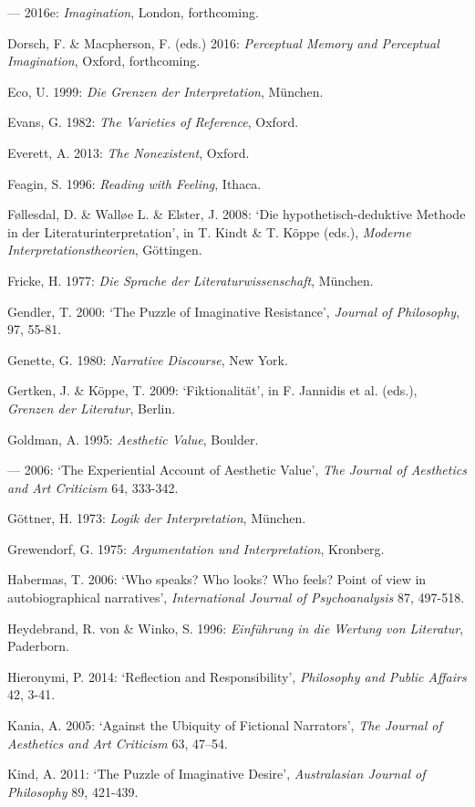 \begin{hangparas}{.5cm}{1}
--- 2016e: \emph{Imagination}, London, forthcoming.

Dorsch, F. \& Macpherson, F. (eds.) 2016: \emph{Perceptual Memory and Perceptual Imagination}, Oxford, forthcoming. 

Eco, U. 1999: \emph{Die Grenzen der Interpretation}, M\"unchen. 

Evans, G. 1982: \emph{The Varieties of Reference}, Oxford. 

Everett, A. 2013: \emph{The Nonexistent}, Oxford. 

Feagin, S. 1996: \emph{Reading with Feeling}, Ithaca.

F\o{}llesdal, D. \& Wall\o{}e L. \& Elster, J. 2008: `Die hypothetisch-deduktive Methode in der Literaturinterpretation', in T. Kindt \& T. K\"oppe (eds.), \emph{Moderne Interpretationstheorien}, G\"ottingen.

Fricke, H. 1977: \emph{Die Sprache der Literaturwissenschaft}, M\"unchen.

Gendler, T. 2000: `The Puzzle of Imaginative Resistance', \emph{Journal of Philosophy}, 97, 55-81.

Genette, G. 1980: \emph{Narrative Discourse}, New York. 

Gertken, J. \& K\"oppe, T. 2009: `Fiktionalit\"at', in F. Jannidis et al. (eds.), \emph{Grenzen der Literatur}, Berlin. 

Goldman, A. 1995: \emph{Aesthetic Value}, Boulder. 

--- 2006: `The Experiential Account of Aesthetic Value', \emph{The Journal of Aesthetics and Art Criticism} 64, 333-342.

G\"ottner, H. 1973: \emph{Logik der Interpretation}, M\"unchen.

Grewendorf, G. 1975: \emph{Argumentation und Interpretation}, Kronberg.

Habermas, T. 2006: `Who speaks? Who looks? Who feels? Point of view in autobiographical narratives', \emph{International Journal of Psychoanalysis} 87, 497-518. 

Heydebrand, R. von \& Winko, S. 1996: \emph{Einf\"uhrung in die Wertung von Literatur}, Paderborn.

Hieronymi, P. 2014: `Reflection and Responsibility', \emph{Philosophy and Public Affairs} 42, 3-41.

Kania, A. 2005: `Against the Ubiquity of Fictional Narrators', \emph{The Journal of Aesthetics and Art Criticism} 63, 47--54.

Kind, A. 2011: `The Puzzle of Imaginative Desire', \emph{Australasian Journal of Philosophy} 89, 421-439.


\end{hangparas}

